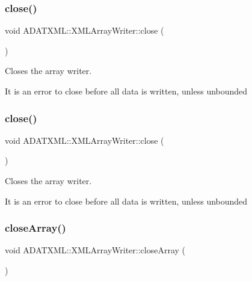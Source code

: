 \subsubsection{\texorpdfstring{close()}{close()}\hspace{0.1cm}{\footnotesize\ttfamily [1/2]}}
{\footnotesize\ttfamily void A\+D\+A\+T\+X\+M\+L\+::\+X\+M\+L\+Array\+Writer\+::close (\begin{DoxyParamCaption}{ }\end{DoxyParamCaption})}



Closes the array writer. 

It is an error to close before all data is written, unless unbounded \mbox{\label{classADATXML_1_1XMLArrayWriter_a89774ac16fd8636da94745ccba7add0a}} 
\subsubsection{\texorpdfstring{close()}{close()}\hspace{0.1cm}{\footnotesize\ttfamily [2/2]}}
{\footnotesize\ttfamily void A\+D\+A\+T\+X\+M\+L\+::\+X\+M\+L\+Array\+Writer\+::close (\begin{DoxyParamCaption}{ }\end{DoxyParamCaption})}



Closes the array writer. 

It is an error to close before all data is written, unless unbounded \mbox{\label{classADATXML_1_1XMLArrayWriter_a5d6b79a0e8add658220f21e5fc138230}} 
\subsubsection{\texorpdfstring{closeArray()}{closeArray()}\hspace{0.1cm}{\footnotesize\ttfamily [1/2]}}
{\footnotesize\ttfamily void A\+D\+A\+T\+X\+M\+L\+::\+X\+M\+L\+Array\+Writer\+::close\+Array (\begin{DoxyParamCaption}{ }\end{DoxyParamCaption})}


